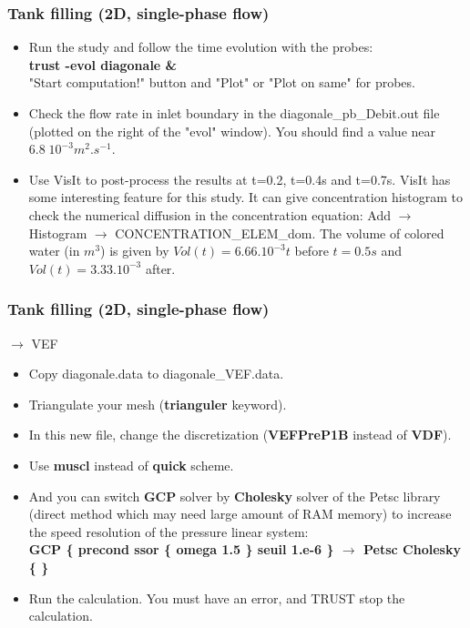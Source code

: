 \documentclass[10pt, hyperref={unicode=true,pdfusetitle, bookmarks=true,bookmarksnumbered=false,bookmarksopen=false, breaklinks=false,pdfborder={0 0l 1},backref=true,colorlinks=true,linkcolor=darkblue,pageanchor}]{beamer}
\begin{document}
\begin{frame}
\frametitle{Tank filling (2D, single-phase flow)}
\begin{block}{}

\begin{itemize}
\item Run the study and follow the time evolution with the probes:\\
\textbf{trust -evol diagonale \&} \\
"Start computation!" button and "Plot" or "Plot on same" for probes.
\item Check the flow rate in inlet boundary in the diagonale\_pb\_Debit.out file (plotted on the right of the "evol" window). You should find a value near $6.8 \; 10^{-3} m^2.s^{-1}$.
\item Use VisIt to post-process the results at t=0.2, t=0.4s and t=0.7s. VisIt has some interesting feature for this study. It can give concentration histogram to check the numerical diffusion in the concentration equation: Add $\rightarrow$ Histogram $\rightarrow$ CONCENTRATION\_ELEM\_dom.
The volume of colored water (in $m^3$) is given by $Vol(t)= 6.66.10^{-3} t$ before $t=0.5s$ and $Vol(t)=3.33.10^{-3}$ after.
\end{itemize}

\end{block}
\end{frame}
\begin{frame}
\frametitle{Tank filling (2D, single-phase flow)}
\begin{block}{$\rightarrow$ VEF}

\begin{itemize}
\item Copy diagonale.data to diagonale\_VEF.data.
\item Triangulate your mesh (\textbf{trianguler} keyword).
\item In this new file, change the discretization (\textbf{VEFPreP1B} instead of \textbf{VDF}).
\item Use \textbf{muscl} instead of \textbf{quick} scheme.
\item And you can switch \textbf{GCP} solver by \textbf{Cholesky} solver of the Petsc library (direct method which may need large amount of RAM memory) to increase the speed resolution of the pressure linear system:\\
\textbf{GCP \{ precond ssor \{ omega 1.5 \} seuil 1.e-6 \} $\rightarrow$ Petsc Cholesky \{ \}}
\item Run the calculation. You must have an error, and TRUST stop the calculation. 
\end{itemize}

\end{block}
\end{frame}
\end{document}
